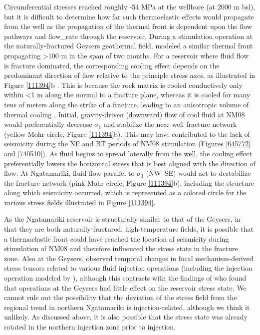 Circumferential stresses reached roughly -54 MPa at the wellbore (at 2000 m bsl), but it is difficult to determine how far such thermoelastic effects would propagate from the well as the propagation of the thermal front is dependent upon the flow pathways and \gls{flow_rate} through the reservoir. During a \gls{stimulation} operation at the naturally-fractured Geysers geothermal field, \citet{Jeanne_2015tensor} modeled a similar thermal front propagating \textgreater100 m in the span of two months. For a reservoir where fluid flow is fracture dominated, the corresponding cooling effect depends on the predominant direction of flow relative to the principle stress axes, as illustrated in Figure \ref{111394}b \citep{Jeanne_2015tensor}. This is because the rock matrix is cooled conductively only within \textless1 m along the normal to a fracture plane, whereas it is cooled for many tens of meters along the strike of a fracture, leading to an anisotropic volume of thermal cooling \citep{De_Simone_2013,Jeanne_2015tensor}. Initial, gravity-driven (downward) flow of cool fluid at NM08 would preferentially decrease $\sigma_{1}$ and stabilize the near-well fracture network (yellow Mohr circle, Figure \ref{111394}b). This may have contributed to the lack of seismicity during the NF and BT periods of NM08 stimulation (Figures \ref{645772} and \ref{740510}). As fluid begins to spread laterally from the well, the cooling effect preferentially lowers the horizontal stress that is best aligned with the direction of flow. At Ngatamariki, fluid flow parallel to $\sigma_{3}$ (NW--SE) would act to destabilize the fracture network (pink Mohr circle, Figure \ref{111394}b), including the structure along which seismicity occurred, which is represented as a colored circle for the various stress fields illustrated in Figure \ref{111394}.

As the Ngatamariki reservoir is structurally similar to that of the Geysers, in that they are both naturally-fractured, high-temperature fields, it is possible that a thermoelastic front could have reached the location of seismicity during \gls{stimulation} of NM08 and therefore influenced the stress state in the fracture zone. Also at the Geysers, \citet{Mart_nez_Garz_n_2013} observed temporal changes in focal mechanism-derived stress tensors related to various fluid injection operations (including the injection operation modeled by \citet{Jeanne_2015tensor}), although this contrasts with the findings of \citet{Boyle_2014} who found that operations at the Geysers had little effect on the reservoir stress state. We cannot rule out the possibility that the deviation of the stress field from the regional trend in northern Ngatamariki is injection-related, although we think it unlikely. As discussed above, it is also possible that the stress state was already rotated in the northern injection zone prior to injection.

